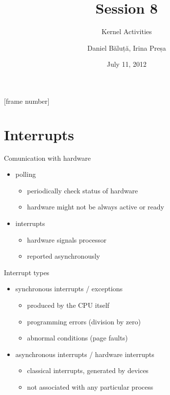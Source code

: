 \documentclass{workshop}
\title[Sesssion 8]{Session 8}
\subtitle{Kernel Activities}
\author{Daniel Băluță, Irina Preșa}
\date{July 11, 2012}
\begin{document}
[frame number]

\frame{\titlepage}

\section{Interrupts}
\begin{frame}{Comunication with hardware}
\begin{itemize}
\item polling
\begin{itemize}
\item periodically check status of hardware 
\item hardware might not be always active or ready
\end{itemize}
\item interrupts
\begin{itemize}
\item hardware signals processor 
\item reported asynchronously 
\end{itemize}
\end{itemize}
\end{frame}

\begin{frame}{Interrupt types}
\begin{itemize}
\item synchronous interrupts / exceptions
\begin{itemize}
\item produced by the CPU itself
\item programming errors (division by zero)
\item abnormal conditions (page faults)
\end{itemize}
\item asynchronous interrupts / hardware interrupts
\begin{itemize}
\item classical interrupts, generated by devices
\item not associated with any particular process
\end{itemize}
\end{itemize}
\end{frame}
\end{document}
